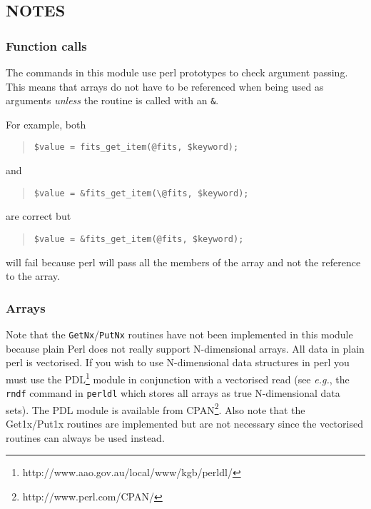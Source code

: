 \documentclass[twoside,11pt]{article}
\newcommand{\htmladdnormallinkfoot}[2]{#1\footnote{#2}}
\newcommand{\xlabel}[1]{}
\newenvironment{myquote}{\begin{quote}\begin{small}}{\end{small}\end{quote}}
\begin{document}
\subsection{\xlabel{notes}\label{notes}NOTES}

\subsubsection{Function calls}%

The commands in this module use  perl prototypes to check argument 
passing. This means that arrays do not have to be referenced when being
used as arguments \emph{unless\/} the routine is called with an \texttt{\&}.

For example, both

\begin{myquote}
\begin{verbatim}
$value = fits_get_item(@fits, $keyword);
\end{verbatim}
\end{myquote}
and
\begin{myquote}
\begin{verbatim}
$value = &fits_get_item(\@fits, $keyword);
\end{verbatim}
\end{myquote}

are correct but
\begin{myquote} 
\begin{verbatim}
$value = &fits_get_item(@fits, $keyword);
\end{verbatim}
\end{myquote}

will fail because perl will pass all the members of the array and not the
reference to the array. 

\subsubsection{Arrays}%

Note that the \texttt{GetNx}/\texttt{PutNx} routines have not been
implemented in this module because plain Perl does not really support
N-dimensional arrays.  All data in plain perl is vectorised.  If you
wish to use N-dimensional data structures in perl you must use the
\htmladdnormallinkfoot{PDL}{http://www.aao.gov.au/local/www/kgb/perldl/}
module in conjunction with a vectorised read (see \emph{e.g.}, the
\texttt{rndf} command in \texttt{perldl} which stores all arrays as
true N-dimensional data sets). The PDL module is available from
\htmladdnormallinkfoot{CPAN}{http://www.perl.com/CPAN/}. Also
note that the Get1x/Put1x routines are implemented but are not
necessary since the vectorised routines can always be used instead.
\end{document}
